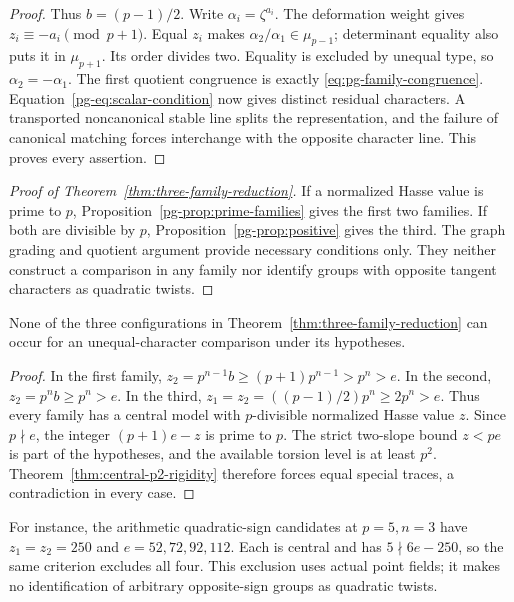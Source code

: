 \begin{proof}
Thus $b=(p-1)/2$. Write $\alpha_i=\zeta^{a_i}$. The deformation weight gives $z_i\equiv-a_i\pmod{p+1}$. Equal $z_i$ makes $\alpha_2/\alpha_1\in\mu_{p-1}$; determinant equality also puts it in $\mu_{p+1}$. Its order divides two. Equality is excluded by unequal type, so $\alpha_2=-\alpha_1$. The first quotient congruence is exactly \eqref{eq:pg-family-congruence}. Equation~\eqref{pg-eq:scalar-condition} now gives distinct residual characters. A transported noncanonical stable line splits the representation, and the failure of canonical matching forces interchange with the opposite character line. This proves every assertion.
\end{proof}

\begin{proof}[Proof of Theorem~\ref{thm:three-family-reduction}]
If a normalized Hasse value is prime to $p$, Proposition~\ref{pg-prop:prime-families} gives the first two families. If both are divisible by $p$, Proposition~\ref{pg-prop:positive} gives the third. The graph grading and quotient argument provide necessary conditions only. They neither construct a comparison in any family nor identify groups with opposite tangent characters as quadratic twists.
\end{proof}

\begin{corollary}\label{pg-cor:exclusion}
None of the three configurations in Theorem~\ref{thm:three-family-reduction} can occur for an unequal-character comparison under its hypotheses.
\end{corollary}
\begin{proof}
In the first family, $z_2=p^{n-1}b\ge(p+1)p^{n-1}>p^n>e$. In the second, $z_2=p^nb\ge p^n>e$. In the third, $z_1=z_2=((p-1)/2)p^n\ge2p^n>e$. Thus every family has a central model with $p$-divisible normalized Hasse value $z$. Since $p\nmid e$, the integer $(p+1)e-z$ is prime to $p$. The strict two-slope bound $z<pe$ is part of the hypotheses, and the available torsion level is at least $p^2$. Theorem~\ref{thm:central-p2-rigidity} therefore forces equal special traces, a contradiction in every case.
\end{proof}

For instance, the arithmetic quadratic-sign candidates at $p=5,n=3$ have $z_1=z_2=250$ and $e=52,72,92,112$. Each is central and has $5\nmid6e-250$, so the same criterion excludes all four. This exclusion uses actual point fields; it makes no identification of arbitrary opposite-sign groups as quadratic twists.
